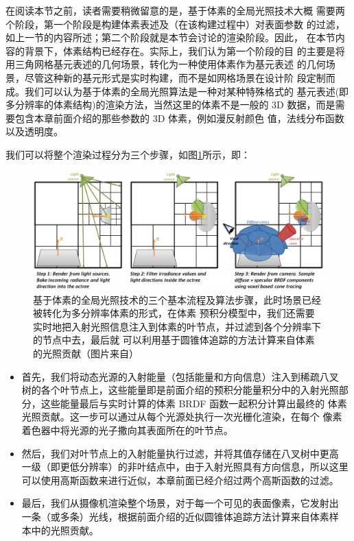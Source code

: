 在阅读本节之前，读者需要稍微留意的是，基于体素的全局光照技术大概 需要两个阶段，第一个阶段是构建体素表述及（在该构建过程中）对表面参数 的过滤，如上一节的内容所述；第二个阶段就是本节会讨论的渲染阶段。因此， 在本节内容的背景下，体素结构已经存在。实际上，我们认为第一个阶段的目 的主要是将用三角网格基元表述的几何场景，转化为一种使用体素作为基元表述 的几何场景，尽管这种新的基元形式是实时构建，而不是如网格场景在设计阶 段定制而成。我们可以认为基于体素的全局光照算法是一种对某种特殊格式的 基元表述(即多分辨率的体素结构)的渲染方法，当然这里的体素不是一般的 3D 数据，而是需要包含本章前面介绍的那些参数的 3D 体素，例如漫反射颜色 值，法线分布函数以及透明度。

我们可以将整个渲染过程分为三个步骤，如图\ref{f:vct-steps}所示，即：

\begin{figure}
\begin{fullwidth}
	\includegraphics[width=\thewidth]{figures/vct/vct-3}
	\caption{基于体素的全局光照技术的三个基本流程及算法步骤，此时场景已经被转化为多分辨率体素的形式，在体素 预积分模型中，我们还需要实时地把入射光照信息注入到体素的叶节点，并过滤到各个分辨率下的节点中去，最后就 可以利用基于圆锥体追踪的方法计算来自体素的光照贡献（图片来自\cite{a:InteractiveIndirectIlluminationUsingVoxelConeTracing}）}
	\label{f:vct-steps}
\end{fullwidth}
\end{figure}

\begin{itemize}
	\item 首先，我们将动态光源的入射能量（包括能量和方向信息）注入到稀疏八叉 树的各个叶节点上，这些能量即是前面介绍的预积分能量积分中的入射光照部分，这些能量最后与实时计算的体素 BRDF 函数一起积分计算出最终的 体素光照贡献。这一步可以通过从每个光源处执行一次光栅化渲染，在每个 像素着色器中将光源的光子撒向其表面所在的叶节点。
	\item 然后，我们对叶节点上的入射能量执行过滤，并将其值存储在八叉树中更高 一级（即更低分辨率）的非叶结点中，由于入射光照具有方向信息，所以这里 可以使用高斯函数来进行近似，本章前面已经介绍过两个高斯函数的过滤。
	\item 最后，我们从摄像机渲染整个场景，对于每一个可见的表面像素，它发射出 一条（或多条）光线，根据前面介绍的近似圆锥体追踪方法计算来自体素样 本中的光照贡献。
\end{itemize}

